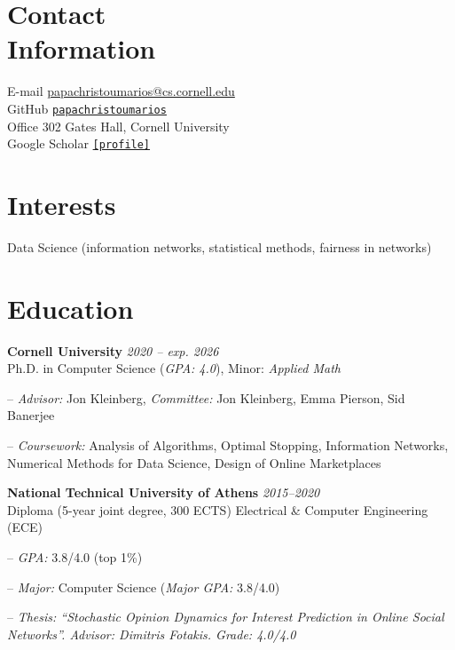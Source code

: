 \documentclass[margin, 10pt]{res}
\newcommand{\field}[2]{\noindent \textbf{#1} \hfill #2 \\}
\newcommand{\specialurl}[2]{\href { #2 } {\nolinkurl{[#1]}}}
\begin{document}
\begin{resume}

\section{Contact \\ Information} 
E-mail \hfill \url{papachristoumarios@cs.cornell.edu} \\
GitHub \hfill \href{http://github.com/papachristoumarios}{\nolinkurl{papachristoumarios}} \\
Office \hfill 302 Gates Hall, Cornell University \\
Google Scholar \hfill \specialurl{profile}{https://scholar.google.gr/citations?user=T12JO3MAAAAJ&hl=en}


\section{Interests} Data Science (information networks, statistical methods, fairness in networks)

\section{Education}
\field {Cornell University} {\emph{2020 -- exp. 2026}}
Ph.D. in Computer Science (\emph{GPA: 4.0}), Minor: \emph{Applied Math}
\begin{compactitem}
\item[--] \emph{Advisor:} Jon Kleinberg, \emph{Committee:} Jon Kleinberg, Emma Pierson, Sid Banerjee 
\item[--] \emph{Coursework:} Analysis of Algorithms, Optimal Stopping, Information Networks, Numerical Methods for Data Science, Design of Online Marketplaces
\end{compactitem} 
 
\field{National Technical University of Athens}  {\emph{2015--2020}} 
Diploma (5-year joint degree, 300 ECTS) Electrical \& Computer Engineering (ECE)
\begin{compactitem}
\item[--] \emph{GPA:} 3.8/4.0 (top 1\%)
\item[--] \emph{Major:} Computer Science (\emph{Major GPA:} 3.8/4.0)
\item[--] \emph{Thesis: ``Stochastic Opinion Dynamics for Interest Prediction in Online Social Networks''. Advisor: Dimitris Fotakis. Grade: 4.0/4.0}
\end{compactitem} 



\end{resume}
\end{document}
